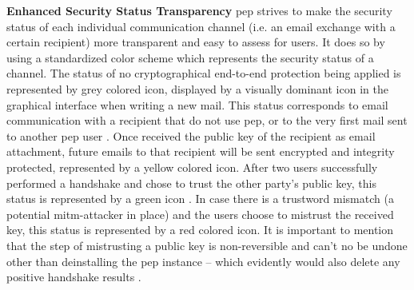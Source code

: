 \newline
\newline
\textbf{Enhanced Security Status Transparency}\newline
\acrshort{pep} strives to make the security status of each individual communication channel (i.e. an email exchange with a certain recipient) more transparent and easy to assess for users. It does so by using a standardized color scheme which represents the security status of a channel. The status of no cryptographical end-to-end protection being applied is represented by grey colored icon, displayed by a visually dominant icon in the graphical interface when writing a new mail. This status corresponds to email communication with a recipient that do not use \acrshort{pep}, or to the very first mail sent to another \acrshort{pep} user \cite{pep-whitepaper}. Once received the public key of the recipient as \acrshort{email} attachment, future \acrshort{email}s to that recipient will be sent encrypted and integrity protected, represented by a yellow colored icon. After two users successfully performed a handshake and chose to trust the other party's public
key, this status is represented by a green icon \cite{pep-whitepaper}. In case there is a trustword mismatch (a potential \acrshort{mitm}-attacker in place) and the users choose to mistrust the received key, this status is represented by a red colored icon. It is important to mention that the step of mistrusting a public
key is non-reversible and can't no be undone other than deinstalling the \acrshort{pep} instance -- which evidently would also delete any positive handshake results \cite{pep-documentation}.